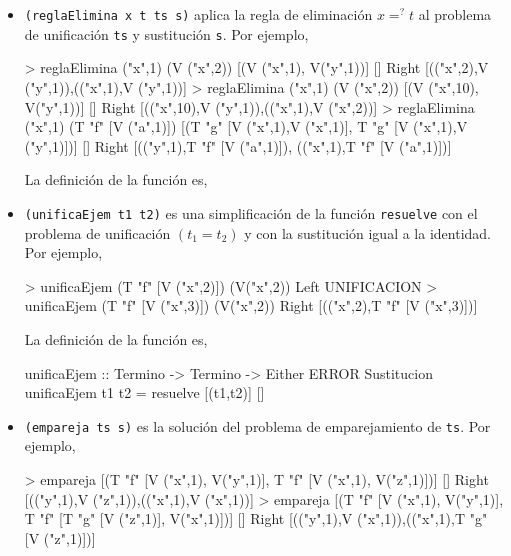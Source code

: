 \begin{itemize}
\item {} \texttt{(reglaElimina x t ts s)}
  aplica la regla de eliminación $x=^? t$ al problema de unificación
  \texttt{ts} y sustitución \texttt{s}. Por ejemplo,
\begin{sesion}
> reglaElimina ("x",1) (V ("x",2)) [(V ("x",1), V("y",1))] 
  []
Right [(("x",2),V ("y",1)),(("x",1),V ("y",1))]
> reglaElimina ("x",1) (V ("x",2)) 
  [(V ("x",10), V("y",1))] 
  []
Right [(("x",10),V ("y",1)),(("x",1),V ("x",2))]
> reglaElimina ("x",1) (T "f" [V ("a",1)]) 
  [(T "g" [V ("x",1),V ("x",1)], 
  T "g" [V ("x",1),V ("y",1)])] []
Right [(("y",1),T "f" [V ("a",1)]),
(("x",1),T "f" [V ("a",1)])]
\end{sesion}
        
La definición de la función es,
       

\item {} \texttt{(unificaEjem t1 t2)} es una
  simplificación de la función \texttt{resuelve} con el problema de
  unificación $(t_1 =
  t_2)$ y con la sustitución igual a la identidad. Por ejemplo,
\begin{sesion}
> unificaEjem (T "f" [V ("x",2)]) (V("x",2))
Left UNIFICACION
> unificaEjem (T "f" [V ("x",3)]) (V("x",2))
Right [(("x",2),T "f" [V ("x",3)])]
\end{sesion}
        
La definición de la función es,
       
\begin{codigo}
unificaEjem :: Termino -> Termino -> Either ERROR Sustitucion
unificaEjem t1 t2 = resuelve [(t1,t2)] []
\end{codigo}   

\item {} \texttt{(empareja ts s)} es la
  solución del problema de emparejamiento de \texttt{ts}. Por ejemplo,
\begin{sesion}
> empareja [(T "f" [V ("x",1), V("y",1)], 
  T "f" [V ("x",1), V("z",1)])] []
Right [(("y",1),V ("z",1)),(("x",1),V ("x",1))]
> empareja [(T "f" [V ("x",1), V("y",1)], 
  T "f" [T "g" [V ("z",1)], V("x",1)])] []
Right [(("y",1),V ("x",1)),(("x",1),T "g" [V ("z",1)])]
\end{sesion}
        

\end{itemize}
